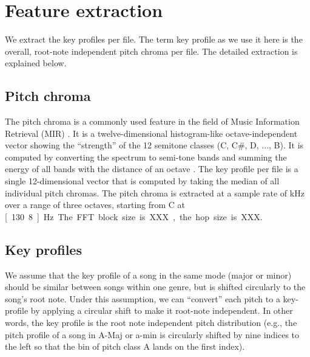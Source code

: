 \documentclass{article}
\begin{document}
\section{Feature extraction}\label{sec:pitch_chroma}
We extract the key profiles per file. The term key profile as we use it here is the overall, root-note independent pitch chroma per file. The detailed extraction is explained below.

\subsection{Pitch chroma}\label{subsec:pc_extract}
The pitch chroma is a commonly used feature in the field of Music Information Retrieval (MIR) \cite{muller_information_2007}. It is a twelve-dimensional histogram-like octave-independent vector showing the “strength” of the 12 semitone classes (C, C\#, D, ..., B). It is computed by converting the spectrum to semi-tone bands and summing the energy of all bands with the distance of an octave \cite{fujishima_realtime_1999}. The key profile per file is a single 12-dimensional vector that is computed by taking the median of all individual pitch chromas. 
The pitch chroma is extracted at a sample rate of \unit[10]{kHz} over a range of three octaves, starting from C at \unit[130.8]{Hz}. The FFT block size is XXX, the hop size is XXX.



\subsection{Key profiles}
We assume that the key profile of a song in the same mode (major or minor) should be similar between songs within one genre, but is shifted circularly to the song's root note. Under this assumption, we can ``convert'' each pitch to a key-profile by applying a circular shift to make it root-note independent. In other words, the key profile is the root note independent pitch distribution (e.g., the pitch profile of a song in A-Maj or a-min is circularly shifted by nine indices to the left so that the bin of pitch class A lands on the first index).
\end{document}
